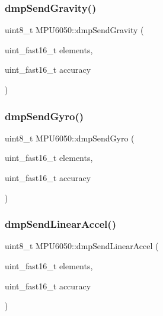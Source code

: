 \mbox{\label{classMPU6050_ad3ac445505589ef21a798f5441f86c7a}} 
\subsubsection{\texorpdfstring{dmpSendGravity()}{dmpSendGravity()}}
{\footnotesize\ttfamily uint8\+\_\+t M\+P\+U6050\+::dmp\+Send\+Gravity (\begin{DoxyParamCaption}\item[{uint\+\_\+fast16\+\_\+t}]{elements,  }\item[{uint\+\_\+fast16\+\_\+t}]{accuracy }\end{DoxyParamCaption})}

\mbox{\label{classMPU6050_a5bc20cd1bebc38fe074e5c0671e5eeef}} 
\subsubsection{\texorpdfstring{dmpSendGyro()}{dmpSendGyro()}}
{\footnotesize\ttfamily uint8\+\_\+t M\+P\+U6050\+::dmp\+Send\+Gyro (\begin{DoxyParamCaption}\item[{uint\+\_\+fast16\+\_\+t}]{elements,  }\item[{uint\+\_\+fast16\+\_\+t}]{accuracy }\end{DoxyParamCaption})}

\mbox{\label{classMPU6050_a4a82e600909d259280493cd83e0ee771}} 
\subsubsection{\texorpdfstring{dmpSendLinearAccel()}{dmpSendLinearAccel()}}
{\footnotesize\ttfamily uint8\+\_\+t M\+P\+U6050\+::dmp\+Send\+Linear\+Accel (\begin{DoxyParamCaption}\item[{uint\+\_\+fast16\+\_\+t}]{elements,  }\item[{uint\+\_\+fast16\+\_\+t}]{accuracy }\end{DoxyParamCaption})}

